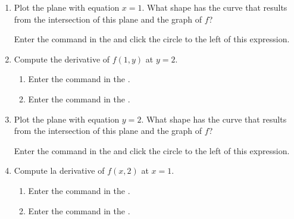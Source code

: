 \begin{enumerate}[leftmargin=*]
\begin{enumerate}

      \item  Plot the plane with equation $x=1$.
            What shape has the curve that results from the intersection of this plane and the graph of $f$?

            \begin{indication}
            Enter the command  in the  and click the circle to the left of this expression.
            \end{indication}

      \item Compute the derivative of $f(1,y)$ at $y=2$.
            \begin{indication}
            \begin{enumerate}
            \item Enter the command  in the .
            \item Enter the command  in the .
            \end{enumerate}
            \end{indication}

      \item Plot the plane with equation $y=2$.
            What shape has the curve that results from the intersection of this plane and the graph of $f$?
            \begin{indication}
            Enter the command  in the  and click the circle to the left of this expression.
            \end{indication}

      \item Compute la derivative of $f(x,2)$ at $x=1$.
            \begin{indication}
            \begin{enumerate}
            \item Enter the command  in the .
            \item Enter the command  in the .
            \end{enumerate}
            \end{indication}


\end{enumerate}
\end{enumerate}
